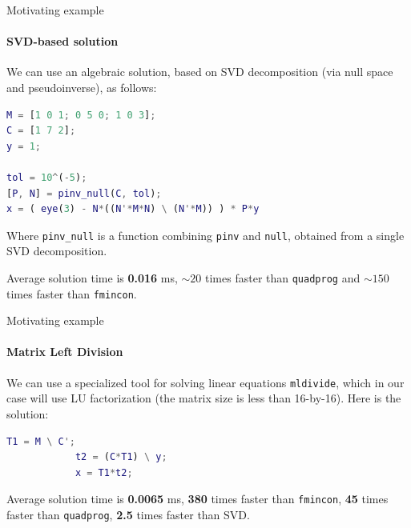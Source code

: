\documentclass{beamer}
\begin{document}
\begin{frame}[fragile]{Motivating example}
\framesubtitle{SVD-based solution}
\begin{flushleft}

We can use an algebraic solution, based on SVD decomposition (via null space and pseudoinverse), as follows:

\begin{lstlisting}[language=Matlab]
M = [1 0 1; 0 5 0; 1 0 3]; 
C = [1 7 2]; 
y = 1;

tol = 10^(-5);
[P, N] = pinv_null(C, tol);
x = ( eye(3) - N*((N'*M*N) \ (N'*M)) ) * P*y
\end{lstlisting}

Where \texttt{pinv\_null} is a function combining \texttt{pinv} and \texttt{null}, obtained from a single SVD decomposition.

Average solution time is \textbf{0.016} ms, $\sim 20$ times faster than \texttt{quadprog} and $\sim 150$ times faster than \texttt{fmincon}.

\end{flushleft}
\end{frame}



\begin{frame}[fragile]{Motivating example}
	\framesubtitle{Matrix Left Division}
	\begin{flushleft}
		
		We can use a specialized tool for solving linear equations \texttt{mldivide}, which in our case will use LU factorization (the matrix size is less than 16-by-16). Here is the solution:
		
		\begin{lstlisting}[language=Matlab]
			T1 = M \ C';
			t2 = (C*T1) \ y;
			x = T1*t2;
		\end{lstlisting}
		
		Average solution time is \textbf{0.0065} ms, \textbf{380} times faster than \texttt{fmincon}, \textbf{45} times faster than \texttt{quadprog}, \textbf{2.5} times faster than SVD.
		
	\end{flushleft}
\end{frame}
\end{document}
